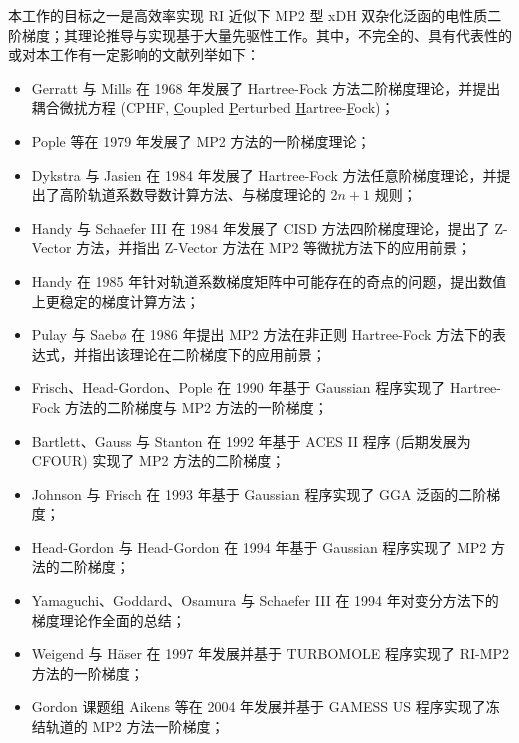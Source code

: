 本工作的目标之一是高效率实现 RI 近似下 MP2 型 xDH 双杂化泛函的电性质二阶梯度；其理论推导与实现基于大量先驱性工作。其中，不完全的、具有代表性的或对本工作有一定影响的文献列举如下：
\begin{itemize}[nosep]
  \item Gerratt 与 Mills 在 1968 年发展了 Hartree-Fock 方法二阶梯度理论，并提出耦合微扰方程 (CPHF, \underline{C}oupled \underline{P}erturbed \underline{H}artree-\underline{F}ock)\cite{Gerratt-Mills.JCP.1968, Gerratt-Mills.JCP.1968a}；
  \item Pople 等在 1979 年发展了 MP2 方法的一阶梯度理论\cite{Pople-Binkley.IJQC.1979}；
  \item Dykstra 与 Jasien 在 1984 年发展了 Hartree-Fock 方法任意阶梯度理论，并提出了高阶轨道系数导数计算方法、与梯度理论的 $2n+1$ 规则\cite{Dykstra-Jasien.CPL.1984}；
  \item Handy 与 Schaefer III 在 1984 年发展了 CISD 方法四阶梯度理论，提出了 Z-Vector 方法，并指出 Z-Vector 方法在 MP2 等微扰方法下的应用前景\cite{Handy-Schaefer.JCP.1984}；
  \item Handy 在 1985 年针对轨道系数梯度矩阵中可能存在的奇点的问题，提出数值上更稳定的梯度计算方法\cite{Handy-Simandiras.CPL.1985}；
  \item Pulay 与 Saebø 在 1986 年提出 MP2 方法在非正则 Hartree-Fock 方法下的表达式，并指出该理论在二阶梯度下的应用前景\cite{Pulay-Saeboe.TCA.1986}；
  \item Frisch、Head-Gordon、Pople 在 1990 年基于 Gaussian 程序实现了 Hartree-Fock 方法的二阶梯度与 MP2 方法的一阶梯度\cite{Frisch-Pople.CP.1990, Frisch-Pople.CPL.1990, Frisch-Pople.CPL.1990a}；
  \item Bartlett、Gauss 与 Stanton 在 1992 年基于 ACES II 程序 (后期发展为 CFOUR) 实现了 MP2 方法的二阶梯度\cite{Gauss-Bartlett.JCP.1992, Stanton-Bartlett.CPL.1992}；
  \item Johnson 与 Frisch 在 1993 年基于 Gaussian 程序实现了 GGA 泛函的二阶梯度\cite{Johnson-Frisch.CPL.1993}；
  \item Head-Gordon 与 Head-Gordon 在 1994 年基于 Gaussian 程序实现了 MP2 方法的二阶梯度\cite{Head-Gordon-Head-Gordon.CPL.1994}；
  \item Yamaguchi、Goddard、Osamura 与 Schaefer III 在 1994 年对变分方法下的梯度理论作全面的总结\cite{Yamaguchi-Schaefer.Oxford.1994}；
  \item Weigend 与 H\"aser 在 1997 年发展并基于 TURBOMOLE 程序实现了 RI-MP2 方法的一阶梯度\cite{Weigend-Haeser.TCA.1997}；
  \item Gordon 课题组 Aikens 等在 2004 年发展并基于 GAMESS US 程序实现了冻结轨道的 MP2 方法一阶梯度\cite{Aikens-Gordon.TCA.2003}；

\end{itemize}
